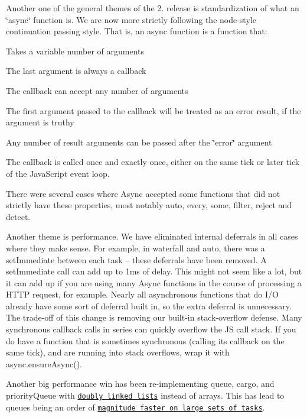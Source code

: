 Another one of the general themes of the 2. release is standardization of what an \char`\"{}async\char`\"{} function is. We are now more strictly following the node-\/style continuation passing style. That is, an async function is a function that\+:


\begin{DoxyEnumerate}
\item Takes a variable number of arguments
\item The last argument is always a callback
\item The callback can accept any number of arguments
\item The first argument passed to the callback will be treated as an error result, if the argument is truthy
\item Any number of result arguments can be passed after the \char`\"{}error\char`\"{} argument
\item The callback is called once and exactly once, either on the same tick or later tick of the Java\+Script event loop.
\end{DoxyEnumerate}

There were several cases where Async accepted some functions that did not strictly have these properties, most notably {\ttfamily auto}, {\ttfamily every}, {\ttfamily some}, {\ttfamily filter}, {\ttfamily reject} and {\ttfamily detect}.

Another theme is performance. We have eliminated internal deferrals in all cases where they make sense. For example, in {\ttfamily waterfall} and {\ttfamily auto}, there was a {\ttfamily set\+Immediate} between each task -- these deferrals have been removed. A {\ttfamily set\+Immediate} call can add up to 1ms of delay. This might not seem like a lot, but it can add up if you are using many Async functions in the course of processing a H\+T\+TP request, for example. Nearly all asynchronous functions that do I/O already have some sort of deferral built in, so the extra deferral is unnecessary. The trade-\/off of this change is removing our built-\/in stack-\/overflow defense. Many synchronous callback calls in series can quickly overflow the JS call stack. If you do have a function that is sometimes synchronous (calling its callback on the same tick), and are running into stack overflows, wrap it with {\ttfamily async.\+ensure\+Async()}.

Another big performance win has been re-\/implementing {\ttfamily queue}, {\ttfamily cargo}, and {\ttfamily priority\+Queue} with \href{https://en.wikipedia.org/wiki/Doubly_linked_list}{\tt doubly linked lists} instead of arrays. This has lead to queues being an order of \href{https://github.com/caolan/async/pull/1205}{\tt magnitude faster on large sets of tasks}.

